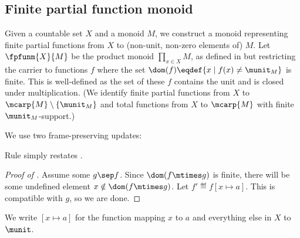\subsection{Finite partial function monoid}
\label{sec:fpfunm}

Given a countable set $X$ and a monoid $M$, we construct a monoid representing finite partial functions from $X$ to (non-unit, non-zero elements of) $M$.
Let $\fpfunm{X}{M}$ be the product monoid $\prod_{x \in X} M$, as defined in  but restricting the carrier to functions $f$ where the set $\dom(f) \eqdef \{ x \mid f(x) \neq \munit_M \}$ is finite.
This is well-defined as the set of these $f$ contains the unit and is closed under multiplication.
(We identify finite partial functions from $X$ to $\mcarp{M}\setminus\{\munit_M\}$ and total functions from $X$ to $\mcarp{M}$ with finite $\munit_M$-support.)

We use two frame-preserving updates:
Rule  simply restates .

\begin{proof}[Proof of ]
  Assume some $g \sep f$. Since $\dom(f \mtimes g)$ is finite, there will be some undefined element $x \notin \dom(f \mtimes g)$. Let $f' \eqdef f[x \mapsto a]$. This is compatible with $g$, so we are done.
\end{proof}

We write $[x \mapsto a]$ for the function mapping $x$ to $a$ and everything else in $X$ to $\munit$.

